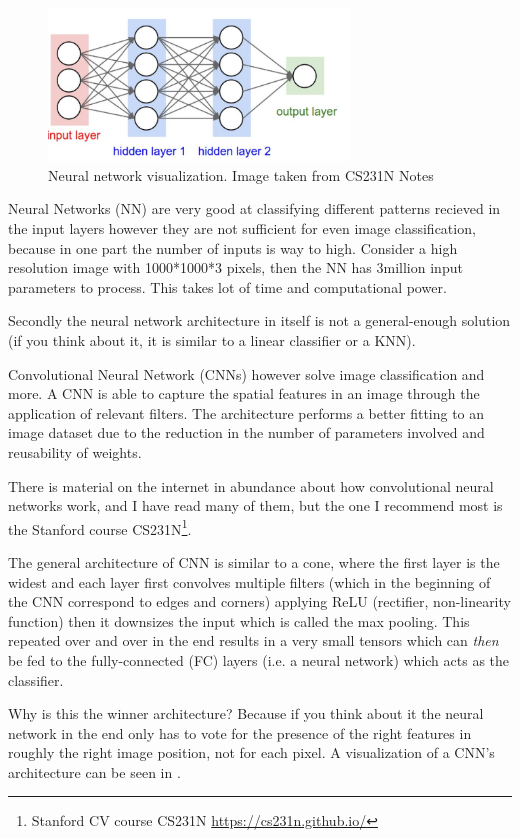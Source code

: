 \begin{figure}[!ht]
    \centering
    \includegraphics[width=80mm, keepaspectratio]{figures/nn.png}
    \caption{Neural network visualization. Image taken from CS231N Notes}
    \label{fig:convnet}
\end{figure}

Neural Networks (NN) are very good at classifying different patterns recieved in the
input layers however they are not sufficient for even image classification,
because in one part the number of inputs is way to high. Consider a high
resolution image with 1000*1000*3 pixels, then the NN has 3million input
parameters to process. This takes lot of time and computational power.

Secondly the neural network architecture in itself is not a
general-enough solution (if you think about it, it is similar to a linear
classifier or a KNN).

Convolutional Neural Network (CNNs) however solve image classification and more.
A CNN is able to capture the spatial features in an image through the
application of relevant filters. The architecture performs a better fitting to
an image dataset due to the reduction in the number of parameters involved and
reusability of weights.


There is material on the internet in abundance about how convolutional neural
networks work, and I have read many of them, but the one I recommend most is the
Stanford course CS231N\footnote{ Stanford CV course CS231N
\url{https://cs231n.github.io/}}. 

The general architecture of CNN is similar to a cone, where the first layer is
the widest and each layer first convolves multiple filters (which in the
beginning of the CNN correspond to edges and corners) applying ReLU (rectifier,
non-linearity function) then it downsizes the input which is called the max
pooling. This repeated over and over in the end results in a very small tensors
which can \emph{then} be fed to the fully-connected (FC) layers (i.e. a neural network)
which acts as the classifier.

Why is this the winner architecture? Because if you think about it the neural
network in the end only has to vote for the presence of the right features in roughly
the right image position, not for each pixel. A visualization of a
CNN's architecture can be seen in .

